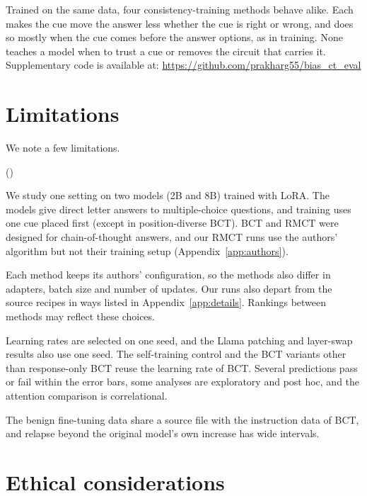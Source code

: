 \documentclass[11pt]{article}
\newcounter{limctr}
\newcommand{\llama}{Llama}\newcommand{\llamafull}{Llama-3.1-8B-Instruct}
\begin{document}
Trained on the same data, four consistency-training methods behave alike. Each makes the cue move the answer less whether the cue is right or wrong, and does so mostly when the cue comes before the answer options, as in training. None teaches a model when to trust a cue or removes the circuit that carries it. Supplementary code is available at: \url{https://github.com/prakharg55/bias_ct_eval}

\section*{Limitations}

We note a few limitations.
\begin{list}{()}{\setlength{\leftmargin}{1.7em}\setlength{\labelwidth}{1.5em}\setlength{\labelsep}{0.3em}\setlength{\itemsep}{1pt}\setlength{\topsep}{2pt}\setlength{\parsep}{0pt}}
\item We study one setting on two models (2B and 8B) trained with LoRA. The models give direct letter answers to multiple-choice questions, and training uses one cue placed first (except in position-diverse BCT). BCT and RMCT were designed for chain-of-thought answers, and our RMCT runs use the authors' algorithm but not their training setup (Appendix~\ref{app:authors}).
\item Each method keeps its authors' configuration, so the methods also differ in adapters, batch size and number of updates. Our runs also depart from the source recipes in ways listed in Appendix~\ref{app:details}. Rankings between methods may reflect these choices.
\item Learning rates are selected on one seed, and the \llama{} patching and layer-swap results also use one seed. The self-training control and the BCT variants other than response-only BCT reuse the learning rate of BCT. Several predictions pass or fail within the error bars, some analyses are exploratory and post hoc, and the attention comparison is correlational.
\item The benign fine-tuning data share a source file with the instruction data of BCT, and relapse beyond the original model's own increase has wide intervals.
\end{list}

\section*{Ethical considerations}
\end{document}
